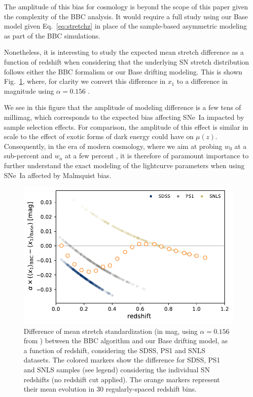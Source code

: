 \documentclass[]{aa} %
\begin{document}
The amplitude of this bias for cosmology is beyond the scope of this paper given
the complexity of the BBC analysis. It would require a full study using our Base
model given Eq.~\ref{eq:stretchz} in place of the sample-based asymmetric
modeling as part of the BBC simulations.

Nonetheless, it is interesting to study the  expected mean stretch difference as
a function of redshift when considering that the underlying SN stretch
distribution follows either the BBC formalism or our Base drifting modeling.
This is shown Fig.~\ref{fig:magdrift}, where, for clarity we convert this
difference in $x_1$ to a difference in magnitude using $\alpha=0.156$
\citep{scolnic2018a}.

We see in this figure that the amplitude of modeling difference is a few tens of
millimag, which corresponds to the expected bias affecting SNe~Ia impacted
by sample selection effects. For comparison, the amplitude of this effect is
similar in scale to the effect of exotic forms of dark energy could
have on $\mu(z)$. Consequently, in the era of modern cosmology, where we aim at
probing $w_0$ at a sub-percent and $w_a$ at a few percent
\citep[e.g.,][]{lsstpaper}, it is therefore of paramount importance to further
understand the exact modeling of the lightcurve parameters when using SNe~Ia
affected by Malmquist bias.

\begin{figure}
    \centering
    \includegraphics[width=\linewidth]{Article_figures/BBC_-stretchevol_grouped.pdf}
    \caption{Difference of mean stretch standardization (in mag, using
        $\alpha=0.156$ from \citealt{scolnic2018a}) between the BBC algorithm
        and our Base drifting model, as a function of redshift, considering the
        SDSS, PS1 and SNLS datasets. The colored markers show the difference for
        SDSS, PS1 and SNLS samples (see legend) considering the individual SN
    redshifts (no redshift cut applied). The orange markers represent their mean
evolution in 30 regularly-spaced redshift bins.}
    \label{fig:magdrift}
\end{figure}
\end{document}
